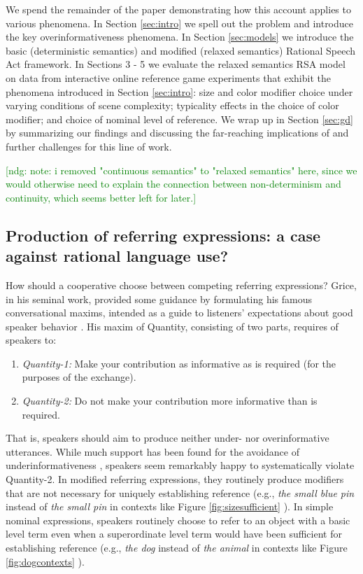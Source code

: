 \documentclass[11pt]{article}
\newcommand{\ndg}[1]{\textcolor{Green}{[ndg: #1]}}
\newcommand{\figref}[1]{Figure \ref{#1}}
\newcommand{\sectionref}[1]{Section \ref{#1}}
\begin{document}
We spend the remainder of the paper demonstrating how this account applies to various phenomena. In \sectionref{sec:intro} we spell out the problem and introduce the key overinformativeness phenomena. In \sectionref{sec:models} we introduce the basic (deterministic semantics) and modified (relaxed semantics) Rational Speech Act framework. In Sections 3 - 5 we evaluate the relaxed semantics RSA model on data from interactive online reference game experiments that exhibit the phenomena introduced in \sectionref{sec:intro}: size and color modifier choice under varying conditions of scene complexity; typicality effects in the choice of color modifier; and choice of nominal level of reference. We wrap up in \sectionref{sec:gd} by summarizing our findings and discussing the far-reaching implications of and further challenges for this line of work.

\ndg{note: i removed "continuous semantics" to "relaxed semantics" here, since we would otherwise need to explain the connection between non-determinism and continuity, which seems better left for later.}

\subsection{Production of referring expressions: a case against rational language use?}

How should a cooperative choose between competing referring expressions? Grice, in his seminal work, provided some guidance by formulating his famous conversational maxims, intended as a guide to listeners' expectations about good speaker behavior \cite{grice1975}. His maxim of Quantity, consisting of two parts, requires of speakers to:

\begin{enumerate}
	\item \emph{Quantity-1:} Make your contribution as informative as is required (for the purposes of the exchange).
	\item \emph{Quantity-2:} Do not make your contribution more informative than is required.
\end{enumerate}

That is, speakers should aim to produce neither under- nor overinformative utterances. While much support has been found for the avoidance of underinformativeness \cite{brennan1996, brown1958words, olson1970language, levinson1983pragmatics, Engelhardt2006, DaviesKatsos2013}, speakers seem remarkably happy to systematically violate Quantity-2. In modified referring expressions, they routinely produce modifiers that are not necessary for uniquely establishing reference (e.g., \emph{the small blue pin} instead of \emph{the small pin} in contexts like \figref{fig:sizesufficient} \cite{gatt2011, Gatt2014, Arts2011, Koolen2011}). In simple nominal expressions, speakers routinely choose to refer to an object with a basic level term even when a superordinate level term would have been sufficient for establishing reference (e.g., \emph{the dog} instead of \emph{the animal} in contexts like \figref{fig:dogcontexts} \cite{Rosch1976, hoffmann1983objektidentifikation, TanakaTaylor91_BasicLevelAndExpertise, Johnson1997, brown1958words}).
\end{document}
